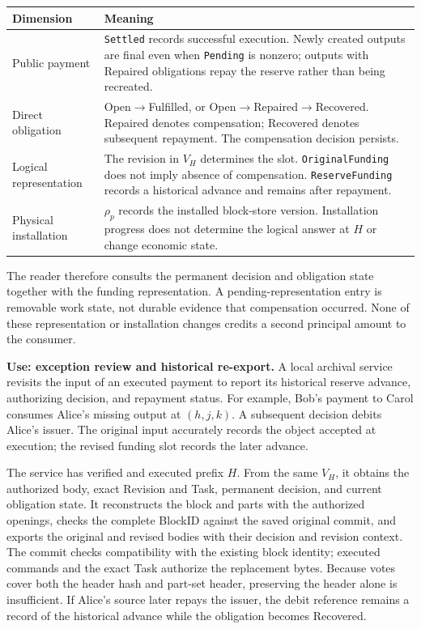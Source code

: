\par\smallskip
{\small
\setlength{\tabcolsep}{3pt}
\noindent
\begin{tabular}{@{}p{}p{}@{}}
\toprule
Dimension & Meaning \\
\midrule
Public payment &
\texttt{Settled} records successful execution. Newly created outputs are final even when \texttt{Pending} is nonzero; outputs with Repaired obligations repay the reserve rather than being recreated. \\

Direct obligation &
Open$\to$Fulfilled, or Open$\to$Repaired$\to$Recovered.
Repaired denotes compensation; Recovered denotes subsequent repayment.
The compensation decision persists. \\

Logical representation &
The revision in $V_H$ determines the slot.
\texttt{OriginalFunding} does not imply absence of compensation.
\texttt{ReserveFunding} records a historical advance and remains
after repayment. \\

Physical installation &
$\rho_p$ records the installed block-store version.
Installation progress does not determine the logical answer at $H$
or change economic state. \\
\bottomrule
\end{tabular}
\par}

The reader therefore consults the permanent decision and obligation
state together with the funding representation. A pending-representation
entry is removable work state, not durable evidence that compensation
occurred. None of these representation or installation changes credits
a second principal amount to the consumer.

\noindent\textbf{Use: exception review and historical re-export.}
A local archival service revisits the input of an executed payment
to report its historical reserve advance, authorizing decision, and
repayment status. For example, Bob's payment to Carol consumes Alice's
missing output at $(h,j,k)$. A subsequent decision debits Alice's issuer.
The original input accurately records the object accepted at execution;
the revised funding slot records the later advance.

The service has verified and executed prefix $H$. From the same $V_H$,
it obtains the authorized body, exact Revision and Task, permanent
decision, and current obligation state. It reconstructs the block and
parts with the authorized openings, checks the complete BlockID against
the saved original commit, and exports the original and revised bodies
with their decision and revision context. The commit checks compatibility
with the existing block identity; executed commands and the exact Task
authorize the replacement bytes. Because votes cover both the header
hash and part-set header, preserving the header alone is insufficient.
If Alice's source later repays the issuer, the debit reference remains
a record of the historical advance while the obligation becomes Recovered.

